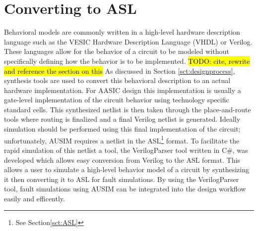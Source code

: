 \documentclass[12pt]{report}
\newcommand{\todo}[1]{\hl{TODO: #1}}
\begin{document}
\section{Converting to ASL}
Behavioral models are commonly written in a high-level hardware description language such as the VESIC Hardware Description Language (VHDL) or Verilog.  These languages allow for the behavior of a circuit to be modeled without specifically defining how the behavior is to be implemented.  \todo{cite, rewrite and reference the section on this}  As discussed in Section \ref{sct:designprocess}, synthesis tools are used to convert this behavioral description to an actual hardware implementation.  For AASIC design this implementation is usually a gate-level implementation of the circuit behavior using technology specific standard cells.  This synthesized netlist is then taken through the place-and-route tools where routing is finalized and a final Verilog netlist is generated.  Ideally simulation should be performed using this final implementation of the circuit; unfortunately, AUSIM requires a netlist in the ASL\footnote{See Section\ref{sct:ASL}} format.   To facilitate the rapid simulation of this netlist a tool, the VerilogParser tool written in C\#\cite{csharp}, was developed which allows easy conversion from Verilog to the ASL format.  This allows a user to simulate a high-level behavior model of a circuit by synthesizing it then converting it to ASL for fault simulations.  By using the VerilogParser tool, fault simulations using AUSIM can be integrated into the design workflow easily and efficently.
\end{document}
